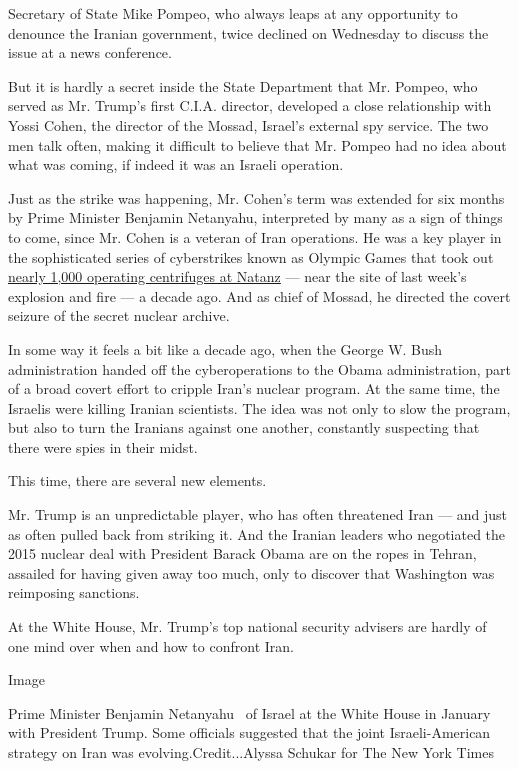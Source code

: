 Secretary of State Mike Pompeo, who always leaps at any opportunity to
denounce the Iranian government, twice declined on Wednesday to discuss
the issue at a news conference.

But it is hardly a secret inside the State Department that Mr. Pompeo,
who served as Mr. Trump's first C.I.A. director, developed a close
relationship with Yossi Cohen, the director of the Mossad, Israel's
external spy service. The two men talk often, making it difficult to
believe that Mr. Pompeo had no idea about what was coming, if indeed it
was an Israeli operation.

Just as the strike was happening, Mr. Cohen's term was extended for six
months by Prime Minister Benjamin Netanyahu, interpreted by many as a
sign of things to come, since Mr. Cohen is a veteran of Iran operations.
He was a key player in the sophisticated series of cyberstrikes known as
Olympic Games that took out
\href{https://www.nytimes.com/2012/06/01/world/middleeast/obama-ordered-wave-of-cyberattacks-against-iran.html}{nearly
1,000 operating centrifuges at Natanz} --- near the site of last week's
explosion and fire --- a decade ago. And as chief of Mossad, he directed
the covert seizure of the secret nuclear archive.

In some way it feels a bit like a decade ago, when the George W. Bush
administration handed off the cyberoperations to the Obama
administration, part of a broad covert effort to cripple Iran's nuclear
program. At the same time, the Israelis were killing Iranian scientists.
The idea was not only to slow the program, but also to turn the Iranians
against one another, constantly suspecting that there were spies in
their midst.

This time, there are several new elements.

Mr. Trump is an unpredictable player, who has often threatened Iran ---
and just as often pulled back from striking it. And the Iranian leaders
who negotiated the 2015 nuclear deal with President Barack Obama are on
the ropes in Tehran, assailed for having given away too much, only to
discover that Washington was reimposing sanctions.

At the White House, Mr. Trump's top national security advisers are
hardly of one mind over when and how to confront Iran.

Image

Prime Minister Benjamin Netanyahu~ of Israel at the White House in
January with President Trump. Some officials suggested that the joint
Israeli-American strategy on Iran was evolving.Credit...Alyssa Schukar
for The New York Times

